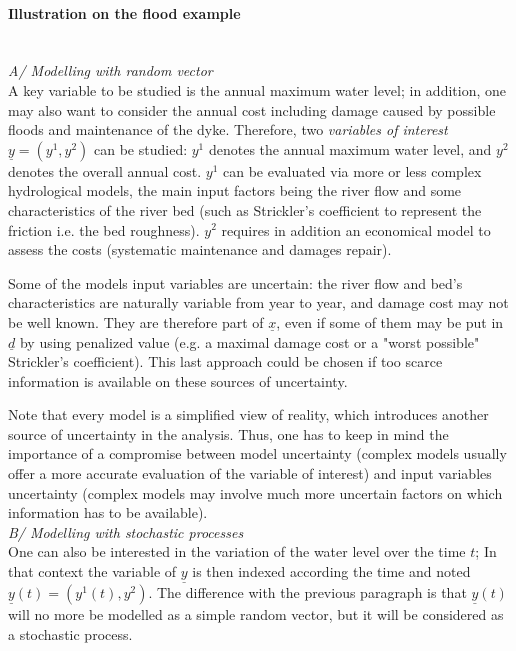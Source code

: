 \paragraph{Illustration on the flood example}
\strut\\
%
\textit{A/ Modelling with random vector}\\
A key variable to be studied is the annual maximum water level; in addition, one may also want to consider the annual cost including damage caused by possible floods and  maintenance of the dyke. Therefore, two {\em variables of interest} $\underline{y} = \left( y^1,y^2 \right)$ can be studied: $y^1$ denotes the annual maximum water level, and $y^2$ denotes the overall annual cost. $y^1$ can be evaluated via more or less complex hydrological models, the main input factors being the river flow and some characteristics of the river bed (such as Strickler's coefficient to represent the friction i.e. the bed roughness). $y^2$ requires in addition an economical model to assess the costs (systematic maintenance and damages repair).

Some of the models input variables are uncertain: the river flow and bed's characteristics are naturally variable from year to year, and damage cost may not be well known. They are therefore part of $\underline{x}$, even if some of them may be put in $\underline{d}$ by using penalized value (e.g. a maximal damage cost or a "worst possible" Strickler's coefficient). This last approach could be chosen if too scarce information is available on these sources of uncertainty.

Note that every model is a simplified view of reality, which introduces another source of uncertainty in the analysis. Thus, one has to keep in mind the importance of a compromise between model uncertainty (complex models usually offer a more accurate evaluation of the variable of interest) and input variables uncertainty (complex models may involve much more uncertain factors on which information has to be available).\\

\textit{B/ Modelling with stochastic processes}\\
One can also be interested in the variation of the water level over the time $t$; In that context the variable of $\underline{y}$ is then indexed according the time and noted $ \underline{y}(t)= \left( y^1(t),y^2 \right)$. The difference with the previous paragraph is that $\underline{y}(t)$ will no more be modelled as a simple random vector, but it will be considered as a stochastic process.

